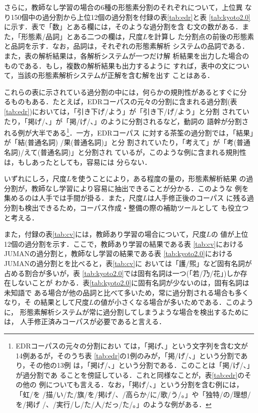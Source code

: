 さらに，教師なし学習の場合の6種の形態素分割のそれぞれについて，上位異
なり150個中の過分割から上位12個の過分割を付録の表\ref{tab:edr}と表
\ref{tab:kyoto2.0}に示す．表で「数」とある欄には，そのような過分割を含
む文の数がある．また，「形態素/品詞」とある二つの欄は，尺度$L$を計算し
た分割点の前後の形態素と品詞を示す．なお，品詞は，それぞれの形態素解析
システムの品詞である．また，表の解析結果は，各解析システムが一つだけ解
析結果を出力した場合のものである．もし，複数の解析結果も出力するように
すれば，表中の文について，当該の形態素解析システムが正解を含む解を出す
ことはある．

これらの表に示されている過分割の中には，何らかの規則性があるとすぐに分
るものもある．たとえば，EDRコーパスの元々の分割に含まれる過分割(表
\ref{tab:edr})においては，「引き下げ/よう」が「引き下/げ/よう」と分割
されていたり，「掲げ/、」が「掲/げ/、」のように分割されるなど，動詞の
語幹が分割される例が大半である\footnote{EDRコーパスの元々の分割におい
  ては，「掲げ、」という文字列を含む文が14例あるが，そのうち表
  \ref{tab:edr}の1例のみが，「掲/げ/、」という分割であり，その他の13例
  は，「掲げ/、」という分割である．このことは「掲/げ/、」が過分割であ
  ることを傍証している．これと同様なことが，表\ref{tab:edr}のその他の
  例についても言える．なお，「掲げ/、」という分割を含む例には，「虹/を
  /描/い/た/旗/を/掲げ/、/高らか/に/歌/う/。」や「独特/の/理想/を/掲げ
  /、/実行/し/た/人/だっ/た/。」のような例がある．}．一方，EDRコーパス
に対する茶筌の過分割では，「結果」が「結(普通名詞) /果(普通名詞)」と分
割されていたり，「考えて」が「考(普通名詞)/えて(普通名詞)」と分割され
ているが，このような例に含まれる規則性は，もしあったとしても，容易には
分らない．

いずれにしろ，尺度$L$を使うことにより，ある程度の量の，形態素解析結果
の過分割が，教師なし学習により容易に抽出できることが分かる．このような
例を集めるのは人手では手間が掛る．また，尺度$L$は人手修正後のコーパス
に残る過分割も検出できるため，コーパス作成・整備の際の補助ツールとして
も役立つと考える．

また，付録の表\ref{tab:cv}には，教師あり学習の場合について，尺度$L$の
値が上位12個の過分割を示す．ここで，教師あり学習の結果である表
\ref{tab:cv}におけるJUMANの過分割と，教師なし学習の結果である表
\ref{tab:kyoto2.0}におけるJUMANの過分割とを比べると，表\ref{tab:cv}に
おいては「護/煕」など固有名詞が占める割合が多いが，表
\ref{tab:kyoto2.0}では固有名詞は一つ(「若/乃/花」)しか存在しないことが
わかる．表\ref{tab:kyoto2.0}に固有名詞が少ないのは，固有名詞は未知語で
ある場合が他の品詞と比べて多いため，常に過分割される場合も多くなり，そ
の結果として尺度$L$の値が小さくなる場合が多いためである．このように，
形態素解析システムが常に過分割してしまうような場合を検出するためには，
人手修正済みコーパスが必要であると言える．

